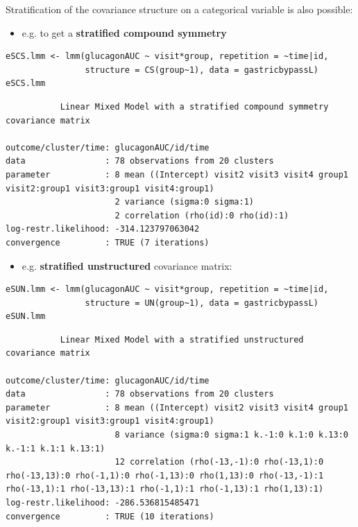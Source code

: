 \documentclass[12pt]{article}
\begin{document}
\noindent Stratification of the covariance structure on a categorical
variable is also possible:
\begin{itemize}
\item e.g. to get a \textbf{stratified compound symmetry}
\end{itemize}
\lstset{language=r,label= ,caption= ,captionpos=b,numbers=none}
\begin{lstlisting}
eSCS.lmm <- lmm(glucagonAUC ~ visit*group, repetition = ~time|id,
                structure = CS(group~1), data = gastricbypassL)
eSCS.lmm
\end{lstlisting}

\begin{verbatim}
	       Linear Mixed Model with a stratified compound symmetry covariance matrix 

outcome/cluster/time: glucagonAUC/id/time 
data                : 78 observations from 20 clusters 
parameter           : 8 mean ((Intercept) visit2 visit3 visit4 group1 visit2:group1 visit3:group1 visit4:group1) 
                      2 variance (sigma:0 sigma:1) 
                      2 correlation (rho(id):0 rho(id):1) 
log-restr.likelihood: -314.123797063042 
convergence         : TRUE (7 iterations)
\end{verbatim}


\clearpage

\begin{itemize}
\item e.g. \textbf{stratified unstructured} covariance matrix:
\end{itemize}
\lstset{language=r,label= ,caption= ,captionpos=b,numbers=none}
\begin{lstlisting}
eSUN.lmm <- lmm(glucagonAUC ~ visit*group, repetition = ~time|id,
                structure = UN(group~1), data = gastricbypassL)
eSUN.lmm
\end{lstlisting}
\begin{verbatim}
	       Linear Mixed Model with a stratified unstructured covariance matrix 

outcome/cluster/time: glucagonAUC/id/time 
data                : 78 observations from 20 clusters 
parameter           : 8 mean ((Intercept) visit2 visit3 visit4 group1 visit2:group1 visit3:group1 visit4:group1) 
                      8 variance (sigma:0 sigma:1 k.-1:0 k.1:0 k.13:0 k.-1:1 k.1:1 k.13:1) 
                      12 correlation (rho(-13,-1):0 rho(-13,1):0 rho(-13,13):0 rho(-1,1):0 rho(-1,13):0 rho(1,13):0 rho(-13,-1):1 rho(-13,1):1 rho(-13,13):1 rho(-1,1):1 rho(-1,13):1 rho(1,13):1) 
log-restr.likelihood: -286.536815485471 
convergence         : TRUE (10 iterations)
\end{verbatim}
\end{document}
